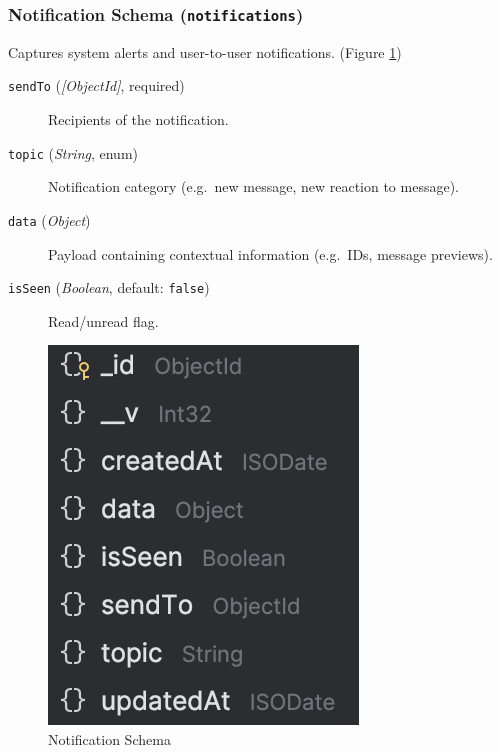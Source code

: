 \subsubsection{Notification Schema (\texttt{notifications})}
Captures system alerts and user-to-user notifications. (Figure \ref{fig:notification-schema})
\begin{description}
  \item[\texttt{sendTo} (\emph{[ObjectId]}, required)]  
    Recipients of the notification.
  \item[\texttt{topic} (\emph{String}, enum)]  
    Notification category (e.g.\ new message, new reaction to message).
  \item[\texttt{data} (\emph{Object})]  
    Payload containing contextual information (e.g.\ IDs, message previews).
  \item[\texttt{isSeen} (\emph{Boolean}, default: \texttt{false})]  
    Read/unread flag.
\end{description}

\begin{figure}[H]
  \centering
  \includegraphics{notification-schema.png}
  \caption{Notification Schema}
  \label{fig:notification-schema}
\end{figure}


